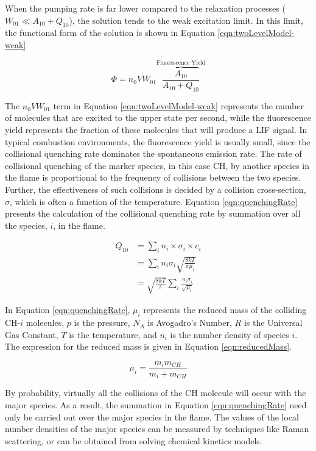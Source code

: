 When the pumping rate is far lower compared to the relaxation processes (\(W_{01}\ll A_{10}+Q_{10}\)), the solution tends to the weak excitation limit.
In this limit, the functional form of the solution is shown in Equation \ref{eqn:twoLevelModel-weak}

\begin{equation}
  \Phi = n_0 V W_{01}\overbrace{\frac{A_{10}}{A_{10}+Q_{10}}}^{\text{Fluorescence Yield}}
  \label{eqn:twoLevelModel-weak}
\end{equation}

The \(n_0VW_{01}\) term in Equation \ref{eqn:twoLevelModel-weak} represents the number of molecules that are excited to the upper state per second, while the fluorescence yield represents the fraction of these molecules that will produce a LIF signal.
In typical combustion environments, the fluorescence yield is usually small, since the collisional quenching rate dominates the spontaneous emission rate.
The rate of collisional quenching of the marker species, in this case CH, by another species in the flame is proportional to the frequency of collisions between the two species.
Further, the effectiveness of such collisions is decided by a collision cross-section, \(\sigma\), which is often a function of the temperature.
Equation \ref{eqn:quenchingRate} presents the calculation of the collisional quenching rate by summation over all the species, \(i\), in the flame.

\begin{align}
  Q_{10} &= \sum_i n_i \times \sigma_i \times c_i \nonumber \\
  & = \sum_i n_i \sigma_i \sqrt{\frac{8kT}{\pi\mu_i}} \nonumber \\
  & = \sqrt{\frac{8kT}{\pi}} \sum_i \frac{n_i \sigma_i}{\sqrt{\mu_i}}
  \label{eqn:quenchingRate}
\end{align}

In Equation \ref{eqn:quenchingRate}, \(\mu_i\) represents the reduced mass of the colliding CH-\(i\) molecules, \(p\) is the pressure, \(N_A\) is Avogadro's Number, \(R\) is the Universal Gas Constant, \(T\) is the temperature, and \(n_i\) is the number density of species \(i\).
The expression for the reduced mass is given in Equation \ref{eqn:reducedMass}.

\begin{equation}
  \mu_i = \frac{ m_i m_{CH} }{ m_i + m_{CH} }
  \label{eqn:reducedMass}
\end{equation}

By probability, virtually all the collisions of the CH molecule will occur with the major species.
As a result, the summation in Equation \ref{eqn:quenchingRate} need only be carried out over the major species in the flame.
The values of the local number densities of the major species can be measured by techniques like Raman scattering, or can be obtained from solving chemical kinetics models.

